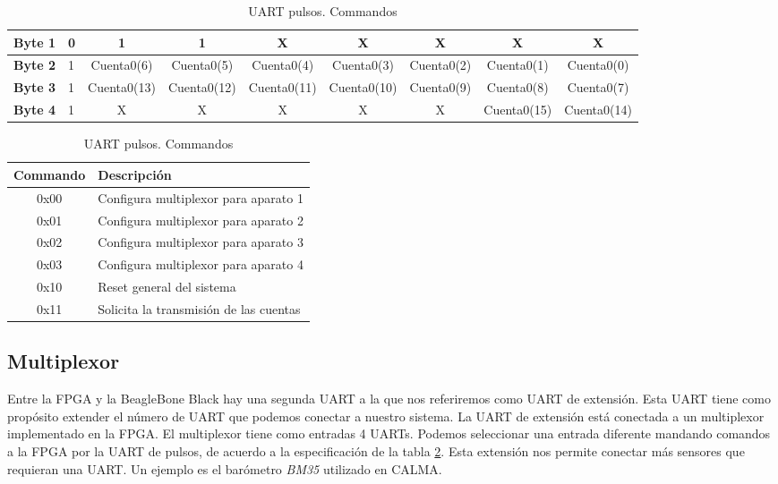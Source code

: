 \begin{table}[h]
\begin{tabularx}{\textwidth}{|l|X|c|c|c|c|c|c|c|}
				\cellcolor[HTML]{C0C0C0}\textbf{Byte 1} & 0 & 1           & 1  		& X	      & X	    & X	  	 & X	       & X	     	\\ \hline
				\cellcolor[HTML]{C0C0C0}\textbf{Byte 2} & 1 & Cuenta0(6)  & Cuenta0(5) 	& Cuenta0(4)  & Cuenta0(3)  & Cuenta0(2) & Cuenta0(1)  & Cuenta0(0)  	\\ \hline
				\cellcolor[HTML]{C0C0C0}\textbf{Byte 3} & 1 & Cuenta0(13) & Cuenta0(12)	& Cuenta0(11) & Cuenta0(10) & Cuenta0(9) & Cuenta0(8)  & Cuenta0(7)  	\\ \hline
				\cellcolor[HTML]{C0C0C0}\textbf{Byte 4} & 1 & X		  & X	 	& X	      & X	    & X		 & Cuenta0(15) & Cuenta0(14)	\\ \hline
			\end{tabularx}
			\caption{UART pulsos. Palabra de datos}
			\label{tab:FPGAUartCont}
			\begin{tabularx}{\hsize}{|c|X|}
		  		\hline
				\rowcolor[HTML]{C0C0C0} 
		  		Commando & Descripción                            \\\hline
		  		0x00     & Configura multiplexor para aparato 1   \\\hline
		  		0x01     & Configura multiplexor para aparato 2   \\\hline
		  		0x02     & Configura multiplexor para aparato 3   \\\hline
		  		0x03     & Configura multiplexor para aparato 4   \\\hline
		  		0x10     & Reset general del sistema              \\\hline
		  		0x11     & Solicita la transmisión de las cuentas \\\hline
			\end{tabularx}
			\caption{UART pulsos. Commandos}
			\label{tab:FPGAUartComm}
		\end{table}
	\subsection{Multiplexor}
		Entre la FPGA y la BeagleBone Black hay una segunda UART a la que nos referiremos como UART de extensión. Esta UART tiene como propósito
		extender el número de UART que podemos conectar a nuestro sistema. La UART de extensión está conectada a un multiplexor implementado en la
		FPGA. El multiplexor tiene como entradas 4 UARTs. Podemos seleccionar una entrada diferente mandando comandos a la FPGA por la UART de pulsos,
		de acuerdo a la especificación de la tabla \ref{tab:FPGAUartComm}. Esta extensión nos permite conectar más sensores que requieran una UART.
		Un ejemplo es el barómetro \emph{BM35}\cite{BM35} utilizado en CALMA.

